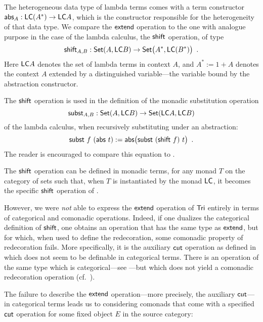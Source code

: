 \documentclass[conference,10pt]{IEEEtran}
\begin{document}
\begin{remark}\label{rem:shift}
  The heterogeneous data type of lambda terms comes with a term constructor $\mathsf{abs}_A : \mathsf{LC} (A^*) \to \mathsf{LC} A$, which 
  is the constructor responsible for the heterogeneity of that data type.
  We compare the $\mathsf{extend}$ operation to the one with analogue purpose in the case of the lambda calculus,
  the $\mathsf{shift}$ operation, of type
  \begin{equation}  \shift_{A,B} : \Set(A,\ULC B) \to \Set\bigl(A^*,\ULC(B^*)\bigr) \enspace .\label{eq:shift}\end{equation}
  Here $\mathsf{LC} A$ denotes the set of lambda terms in context $A$, and $A^*:=1 + A$ denotes the context $A$ extended by a distinguished 
  variable---the variable bound by the abstraction constructor.
  
  The $\mathsf{shift}$ operation is used in the definition of the monadic substitution operation
  \[ \mathsf{subst}_{A,B} : \mathsf{Set}(A,\mathsf{LC} B) \to \mathsf{Set}(\mathsf{LC} A,\mathsf{LC} B) \]
  of the lambda calculus, when recursively substituting under an abstraction:
   \[ \mathsf{subst}~f~(\mathsf{abs}~t):= \mathsf{abs}\bigl(\mathsf{subst}~(\mathsf{shift}~f)~t\bigr) \enspace . \]
  The reader is encouraged to compare this equation to .
  
  The $\mathsf{shift}$ operation can be defined in monadic terms, for any monad $T$ on the category of sets such that,
  when $T$ is instantiated by the monad $\mathsf{LC}$, it becomes the specific $\mathsf{shift}$ operation of .
  
  However, we were \emph{not} able to express the $\mathsf{extend}$ operation of $\mathsf{Tri}$ entirely in terms of categorical and comonadic operations. Indeed, if
  one dualizes the categorical definition of $\mathsf{shift}$, one obtains an operation that has the same type as $\mathsf{extend}$, 
  but for which, when used to define the redecoration, some comonadic property of redecoration fails.
  More specifically, it is the auxiliary $\mathsf{cut}$ operation as defined in  which does not seem to be 
  definable in categorical terms. There is an operation of the same type which is categorical---see ---but
  which does not yield a comonadic redecoration operation (cf.\ ).
\end{remark}


The failure to describe the $\mathsf{extend}$ operation---more precisely, the auxiliary $\mathsf{cut}$---in categorical terms leads us 
to considering comonads that come with a specified $\mathsf{cut}$ operation for some fixed object $E$ in the source category:
\end{document}
